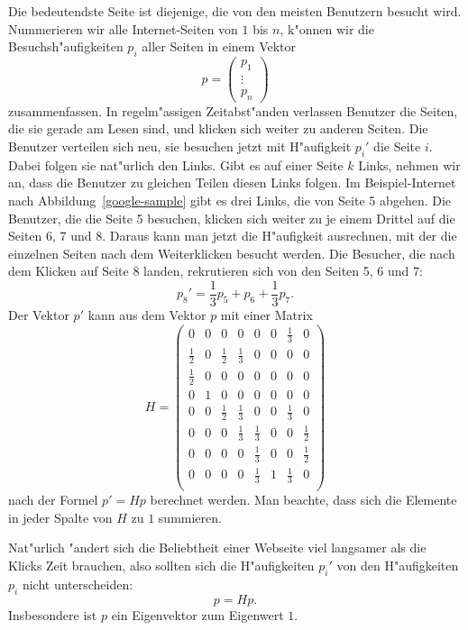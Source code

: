 Die bedeutendste Seite ist diejenige, die von den meisten Benutzern
besucht wird. Nummerieren wir alle Internet-Seiten von $1$ bis $n$,
k"onnen wir die Besuchs\-h"aufigkeiten $p_i$ aller Seiten in einem
Vektor
\[
p=\begin{pmatrix}p_1\\\vdots\\p_n\end{pmatrix}
\]
zusammenfassen. In regelm"assigen Zeitabst"anden verlassen Benutzer
die Seiten, die sie gerade am Lesen sind, und klicken sich weiter zu
anderen Seiten. Die Benutzer verteilen sich neu, sie besuchen jetzt mit
H"aufigkeit $p_i'$ die Seite $i$.
Dabei folgen sie nat"urlich den Links.
Gibt es auf einer Seite $k$ Links, nehmen wir an, dass die Benutzer
zu gleichen Teilen diesen Links folgen.
Im Beispiel-Internet nach Abbildung~\ref{google-sample} gibt es drei
Links, die von Seite 5 abgehen.
Die Benutzer, die die Seite 5
besuchen, klicken sich weiter zu je einem Drittel auf die
Seiten 6, 7 und 8.
Daraus kann man jetzt die H"aufigkeit ausrechnen, mit der die
einzelnen Seiten nach dem Weiterklicken besucht werden.
Die Besucher, die nach dem Klicken auf Seite $8$ landen, rekrutieren
sich von den Seiten 5, 6 und 7:
\[
p_8'=\frac13p_5+p_6+\frac13p_7.
\]
Der Vektor $p'$ kann aus dem Vektor $p$ mit einer Matrix
\[
H=\begin{pmatrix}
      0&0&      0&      0&      0&0&\frac13&      0\\
\frac12&0&\frac12&\frac13&      0&0&      0&      0\\
\frac12&0&      0&      0&      0&0&      0&      0\\
      0&1&      0&      0&      0&0&      0&      0\\
      0&0&\frac12&\frac13&      0&0&\frac13&      0\\
      0&0&      0&\frac13&\frac13&0&      0&\frac12\\
      0&0&      0&      0&\frac13&0&      0&\frac12\\
      0&0&      0&      0&\frac13&1&\frac13&0\\
\end{pmatrix}
\]
nach der Formel $p'=Hp$ berechnet werden. Man beachte, dass sich die
Elemente in jeder Spalte von $H$ zu $1$ summieren.

Nat"urlich "andert sich die Beliebtheit einer Webseite viel langsamer
als die Klicks Zeit brauchen, also sollten sich die H"aufigkeiten
$p_i'$ von den H"aufigkeiten $p_i$ nicht unterscheiden:
\[
p=Hp.
\]
Insbesondere ist $p$ ein Eigenvektor zum Eigenwert $1$.

